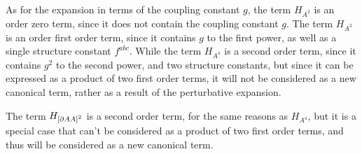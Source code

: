 \documentclass[11pt,a4paper,twoside,pdf]{article}
\numberwithin{equation}{section}
\begin{document}
As for the expansion in terms of the coupling constant \( g \), the term $H_{A^2}$ is
an order zero term, since it does not contain the coupling constant \( g \).
The term $H_{A^3}$ is an order first order term, since it contains $g$ to the first power,
as well as a single structure constant $f^{abc}$. While the term $H_{A^4}$ is a
second order term, since it contains $g^2$ to the second power, and two structure constants,
but since it can be expressed as a product of two first order terms, it will not be considered
as a new canonical term, rather as a result of the perturbative expansion.

The term $H_{\left[ \partial A A \right]^2}$ is a second order term, for the same reasons as $H_{A^4}$, 
but it is a special case that can't be considered as a product of two first order terms,
and thus will be considered as a new canonical term.
\end{document}
